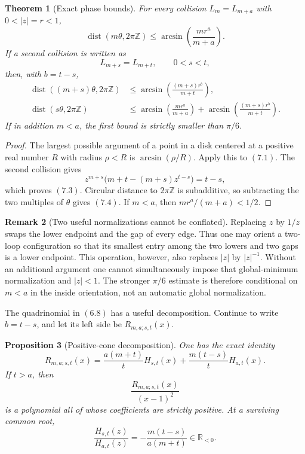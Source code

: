 \documentclass[11pt]{article}
\newtheorem{theorem}{Theorem}[section]
\newtheorem{proposition}[theorem]{Proposition}
\theoremstyle{definition}
\newtheorem{remark}[theorem]{Remark}
\newcommand{\Z}{\mathbb Z}
\begin{document}
\begin{theorem}[Exact phase bounds]\label{thm:phase}
For every collision \(L_m=L_{m+a}\) with \(0<|z|=r<1\),
\begin{equation}
 \operatorname{dist}(m\theta,2\pi\Z)
 \leq
 \arcsin\!\left(\frac{mr^a}{m+a}\right).
 \tag{7.2}
\end{equation}
If a second collision is written as
\[
 L_{m+s}=L_{m+t},\qquad 0<s<t,
\]
then, with \(b=t-s\),
\begin{align}
 \operatorname{dist}((m+s)\theta,2\pi\Z)
 &\leq
 \arcsin\!\left(\frac{(m+s)r^b}{m+t}\right),
 \tag{7.3}\\
 \operatorname{dist}(s\theta,2\pi\Z)
 &\leq
 \arcsin\!\left(\frac{mr^a}{m+a}\right)
 +\arcsin\!\left(\frac{(m+s)r^b}{m+t}\right).
 \tag{7.4}
\end{align}
If in addition \(m<a\), the first bound is strictly smaller than \(\pi/6\).
\end{theorem}

\begin{proof}
The largest possible argument of a point in a disk centered at a positive real
number \(R\) with radius \(\rho<R\) is
\(\arcsin(\rho/R)\).  Apply this to \((7.1)\).  The second collision gives
\[
 z^{m+s}\bigl(m+t-(m+s)z^{t-s}\bigr)=t-s,
\]
which proves \((7.3)\).  Circular distance to \(2\pi\Z\) is subadditive,
so subtracting the two multiples of \(\theta\) gives \((7.4)\).  If
\(m<a\), then \(mr^a/(m+a)<1/2\).
\end{proof}

\begin{remark}[Two useful normalizations cannot be conflated]
Replacing \(z\) by \(1/z\) swaps the lower endpoint and the gap of every
edge.  Thus one may orient a two-loop configuration so that its smallest
entry among the two lowers and two gaps is a lower endpoint.  This operation,
however, also replaces \(|z|\) by \(|z|^{-1}\).  Without an additional
argument one cannot simultaneously impose that global-minimum normalization
and \(|z|<1\).  The stronger \(\pi/6\) estimate is therefore conditional on
\(m<a\) in the inside orientation, not an automatic global normalization.
\end{remark}

The quadrinomial in \((6.8)\) has a useful decomposition.  Continue to write
\(b=t-s\), and let its left side be \(R_{m,a;s,t}(x)\).

\begin{proposition}[Positive-cone decomposition]\label{prop:positivecone}
One has the exact identity
\begin{equation}
 R_{m,a;s,t}(x)=
 \frac{a(m+t)}{t}H_{s,t}(x)
 +\frac{m(t-s)}{t}H_{a,t}(x).
 \tag{7.5}
\end{equation}
If \(t>a\), then
\[
 \frac{R_{m,a;s,t}(x)}{(x-1)^2}
\]
is a polynomial all of whose coefficients are strictly positive.  At a
surviving common root,
\begin{equation}
 \frac{H_{s,t}(z)}{H_{a,t}(z)}
 =-\frac{m(t-s)}{a(m+t)}\in\mathbb R_{<0}.
 \tag{7.6}
\end{equation}
\end{proposition}
\end{document}
